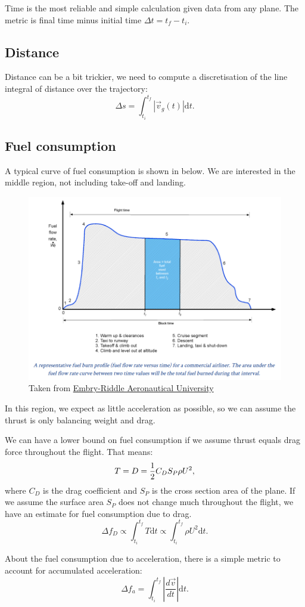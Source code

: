 \documentclass{article}
\begin{document}
Time is the most reliable and simple calculation given data from any plane. The metric is final time minus initial time $\Delta t = t_f - t_i$.

\subsection{Distance}

Distance can be a bit trickier, we need to compute a discretisation of the line integral of distance over the trajectory:
%
\begin{equation}
    \Delta s = \int_{t_i}^{t_f} |\vec{v}_g(t)| \mathrm d t.
\end{equation}

\subsection{Fuel consumption}
\label{subsec:fuel}

A typical curve of fuel consumption is shown in  below. We are interested in the middle region, not including take-off and landing.
%
\begin{figure}
    \centering
    \includegraphics[width=0.85\linewidth]{Screenshot from 2025-07-15 11-41-21.png}
    \caption{Taken from \href{https://eaglepubs.erau.edu/introductiontoaerospaceflightvehicles/chapter/flight-range-endurance/}{Embry-Riddle Aeronautical University}}
    \label{fig:fuel-consumption}
\end{figure}
%
In this region, we expect as little acceleration as possible, so we can assume the thrust is only balancing weight and drag.

We can have a lower bound on fuel consumption if we assume thrust equals drag force throughout the flight. That means:
%
\begin{equation}
    \notag
    T = D = \frac{1}{2} C_D S_{P} \rho U^2,
\end{equation}
%
where $C_D$ is the drag coefficient and $S_P$ is the cross section area of the plane. If we assume the surface area $S_P$ does not change much throughout the flight, we have an estimate for fuel consumption due to drag.
%
\begin{equation}
    \Delta f_D \propto \int_{t_i}^{t_f} T \mathrm d t \propto \int_{t_i}^{t_f} \rho U^2 \mathrm d t.
\end{equation}
%

About the fuel consumption due to acceleration, there is a simple metric to account for accumulated acceleration:
%
\begin{equation}
    \Delta f_a = \int_{t_i}^{t_f} \left| \frac{d \vec{v}}{d t} \right| \mathrm d t.
\end{equation}



\end{document}
